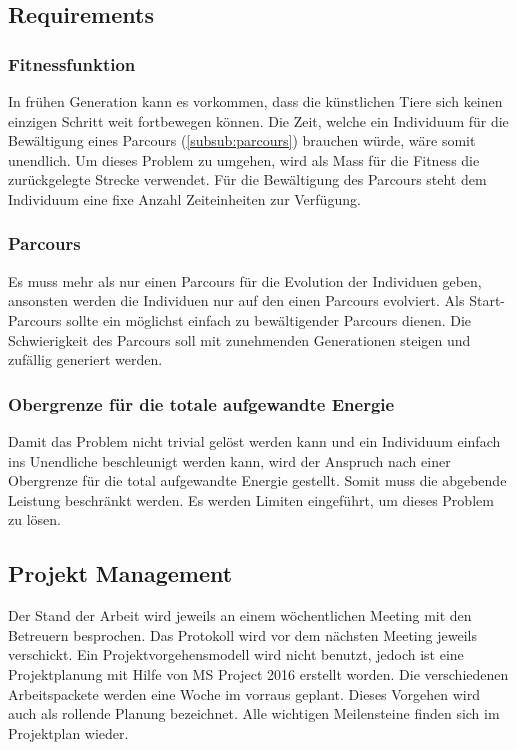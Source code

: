   \subsection{Requirements}

    \subsubsection{Fitnessfunktion}
      In frühen Generation kann es vorkommen, dass die künstlichen Tiere sich keinen einzigen Schritt weit
      fortbewegen können. Die Zeit, welche ein Individuum für die Bewältigung eines Parcours (\vref{subsub:parcours}) brauchen würde, wäre somit unendlich.
      Um dieses Problem zu umgehen, wird als Mass für die Fitness die zurückgelegte Strecke verwendet.
      Für die Bewältigung des Parcours steht dem Individuum eine fixe Anzahl Zeiteinheiten zur Verfügung.
      
    \subsubsection{Parcours\label{subsub:parcours}}
      Es muss mehr als nur einen Parcours für die Evolution der Individuen geben,
      ansonsten werden die Individuen nur auf den einen Parcours evolviert.
      Als Start-Parcours sollte ein möglichst einfach zu bewältigender Parcours dienen.
      Die Schwierigkeit des Parcours soll mit zunehmenden Generationen steigen und zufällig generiert werden.



    \subsubsection{Obergrenze für die totale aufgewandte Energie}

      Damit das Problem nicht trivial gelöst werden kann
      und ein Individuum einfach ins Unendliche beschleunigt werden kann,
      wird der Anspruch nach einer Obergrenze für die total aufgewandte Energie gestellt.
      Somit muss die abgebende Leistung beschränkt werden. Es werden Limiten eingeführt,
      um dieses Problem zu lösen.

    \subsection{Projekt Management}
      Der Stand der Arbeit wird jeweils an einem wöchentlichen Meeting mit den Betreuern besprochen.
      Das Protokoll wird vor dem nächsten Meeting jeweils verschickt.
      Ein Projektvorgehensmodell wird nicht benutzt, jedoch ist eine Projektplanung mit Hilfe von MS Project 2016
      erstellt worden. Die verschiedenen Arbeitspackete werden eine Woche im vorraus geplant.
      Dieses Vorgehen wird auch als rollende Planung bezeichnet. Alle wichtigen Meilensteine finden sich im Projektplan wieder.
